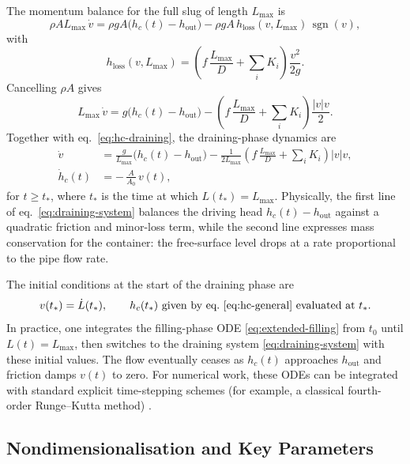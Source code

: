 \documentclass[11pt]{article}
\begin{document}
The momentum balance for the full slug of length $L_{\max}$ is
\[
\rho A L_{\max}\,\dot v
= \rho g A\bigl(h_c(t) - h_{\text{out}}\bigr)
  - \rho g A\,h_{\text{loss}}(v,L_{\max})\,\operatorname{sgn}(v),
\]
with
\[
h_{\text{loss}}(v,L_{\max})
= \left(
    f\,\frac{L_{\max}}{D}
    + \sum_i K_i
  \right)\frac{v^2}{2g}.
\]
Cancelling $\rho A$ gives
\[
L_{\max}\,\dot v
= g\bigl(h_c(t) - h_{\text{out}}\bigr)
  - \left(
      f\,\frac{L_{\max}}{D}
      + \sum_i K_i
    \right)\frac{|v|v}{2}.
\]
Together with eq.~\eqref{eq:hc-draining}, the draining-phase dynamics are
\begin{equation}
\boxed{
\begin{aligned}
\dot v
&= \frac{g}{L_{\max}}\bigl(h_c(t) - h_{\text{out}}\bigr)
   - \frac{1}{2L_{\max}}
     \left(
       f\,\frac{L_{\max}}{D}
       + \sum_i K_i
     \right)|v|v,
   \\[0.5em]
\dot h_c(t)
&= -\,\frac{A}{A_0}\,v(t),
\end{aligned}
}
\label{eq:draining-system}
\end{equation}
for $t \ge t_\ast$, where $t_\ast$ is the time at which $L(t_\ast)=L_{\max}$.
Physically, the first line of eq.~\eqref{eq:draining-system} balances the
driving head $h_c(t)-h_{\text{out}}$ against a quadratic friction and minor-loss
term, while the second line expresses mass conservation for the container: the
free-surface level drops at a rate proportional to the pipe flow rate.

The initial conditions at the start of the draining phase are
\[
v(t_\ast) = \dot L(t_\ast), \qquad
h_c(t_\ast) \text{ given by eq.~\eqref{eq:hc-general} evaluated at } t_\ast.
\]
In practice, one integrates the filling-phase ODE \eqref{eq:extended-filling}
from $t_0$ until $L(t)=L_{\max}$, then switches to the draining system
\eqref{eq:draining-system} with these initial values. The flow eventually ceases
as $h_c(t)$ approaches $h_{\text{out}}$ and friction damps $v(t)$ to zero.  For
numerical work, these ODEs can be integrated with standard explicit
time-stepping schemes (for example, a classical fourth-order Runge--Kutta
method) \cite{hairer_ode}.

\subsection*{Nondimensionalisation and Key Parameters}
\end{document}
